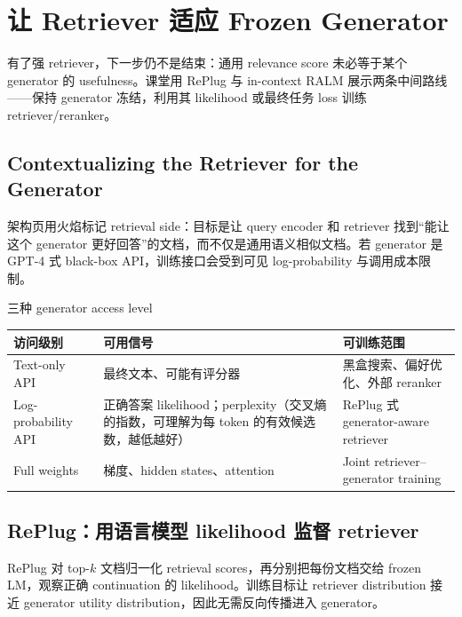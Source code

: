 \section{让 Retriever 适应 Frozen Generator}

有了强 retriever，下一步仍不是结束：通用 relevance score 未必等于某个 generator 的 usefulness。课堂用 RePlug 与 in-context RALM 展示两条中间路线——保持 generator 冻结，利用其 likelihood 或最终任务 loss 训练 retriever/reranker。

\subsection{Contextualizing the Retriever for the Generator}

架构页用火焰标记 retrieval side：目标是让 query encoder 和 retriever 找到“能让这个 generator 更好回答”的文档，而不仅是通用语义相似文档。若 generator 是 GPT-4 式 black-box API，训练接口会受到可见 log-probability 与调用成本限制。


\begin{knowledgebox}{三种 generator access level}
\begin{tabularx}{\textwidth}{L{0.22\textwidth}>{\raggedright\arraybackslash}X >{\raggedright\arraybackslash}X}
\toprule
访问级别 & 可用信号 & 可训练范围 \\
\midrule
Text-only API & 最终文本、可能有评分器 & 黑盒搜索、偏好优化、外部 reranker \\
Log-probability API & 正确答案 likelihood；perplexity（交叉熵的指数，可理解为每 token 的有效候选数，越低越好） & RePlug 式 generator-aware retriever \\
Full weights & 梯度、hidden states、attention & Joint retriever--generator training \\
\bottomrule
\end{tabularx}
\end{knowledgebox}

\subsection{RePlug：用语言模型 likelihood 监督 retriever}

RePlug 对 top-$k$ 文档归一化 retrieval scores，再分别把每份文档交给 frozen LM，观察正确 continuation 的 likelihood。训练目标让 retriever distribution 接近 generator utility distribution，因此无需反向传播进入 generator。

